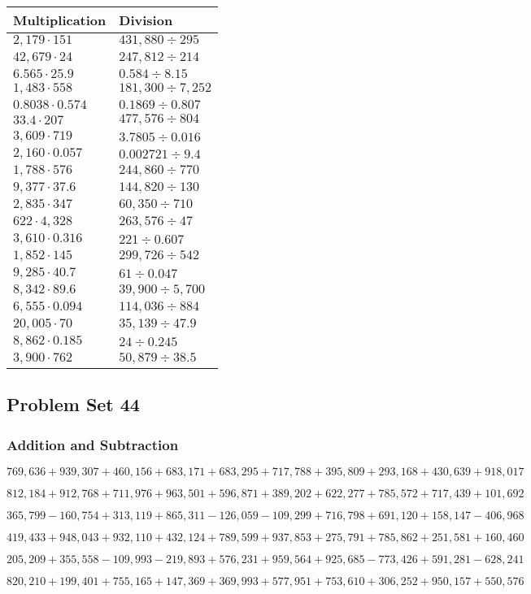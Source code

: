 \begin{longtable}[]{@{}ll@{}}
\toprule
Multiplication & Division\tabularnewline
\midrule
\endhead
\(2,179\cdot151\) & \(431,880÷295\)\tabularnewline
\(42,679\cdot24\) & \(247,812÷214\)\tabularnewline
\(6.565\cdot25.9\) & \(0.584÷8.15\)\tabularnewline
\(1,483\cdot558\) & \(181,300÷7,252\)\tabularnewline
\(0.8038\cdot0.574\) & \(0.1869÷0.807\)\tabularnewline
\(33.4\cdot207\) & \(477,576÷804\)\tabularnewline
\(3,609\cdot719\) & \(3.7805÷0.016\)\tabularnewline
\(2,160\cdot0.057\) & \(0.002721÷9.4\)\tabularnewline
\(1,788\cdot576\) & \(244,860÷770\)\tabularnewline
\(9,377\cdot37.6\) & \(144,820÷130\)\tabularnewline
\(2,835\cdot347\) & \(60,350÷710\)\tabularnewline
\(622\cdot4,328\) & \(263,576÷47\)\tabularnewline
\(3,610\cdot0.316\) & \(221÷0.607\)\tabularnewline
\(1,852\cdot145\) & \(299,726÷542\)\tabularnewline
\(9,285\cdot40.7\) & \(61÷0.047\)\tabularnewline
\(8,342\cdot89.6\) & \(39,900÷5,700\)\tabularnewline
\(6,555\cdot0.094\) & \(114,036÷884\)\tabularnewline
\(20,005\cdot70\) & \(35,139÷47.9\)\tabularnewline
\(8,862\cdot0.185\) & \(24÷0.245\)\tabularnewline
\(3,900\cdot762\) & \(50,879÷38.5\)\tabularnewline
\bottomrule
\end{longtable}

\hypertarget{problem-set-44-4}{%
\subsection{Problem Set 44}\label{problem-set-44-4}}

\hypertarget{addition-and-subtraction-349}{%
\subsubsection{Addition and
Subtraction}\label{addition-and-subtraction-349}}

\(769,636+939,307+460,156+683,171+683,295+717,788+395,809+293,168+430,639+ 918,017\)

\(812,184+912,768+711,976+963,501+596,871+389,202+622,277+785,572+717,439+101,692\)

\(365,799-160,754+313,119+865,311-126,059-109,299+716,798+691,120+158,147-406,968\)

\(419,433+948,043+932,110+432,124+789,599+937,853+275,791+785,862+251,581+160,460\)

\(205,209+355,558-109,993-219,893+576,231+959,564+925,685-773,426+591,281-628,241\)

\(820,210+199,401+755,165+147,369+369,993+577,951+753,610+306,252+950,157+550,576\)

